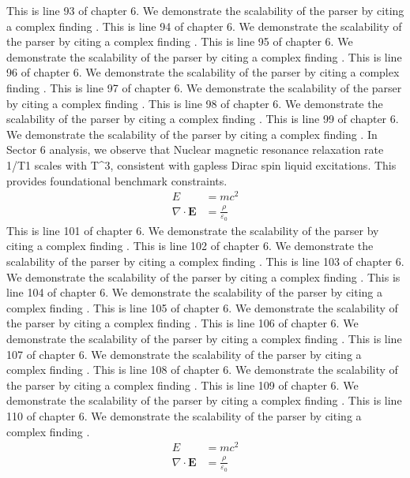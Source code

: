 This is line 93 of chapter 6. We demonstrate the scalability of the parser by citing a complex finding \cite{ref6_93}.
This is line 94 of chapter 6. We demonstrate the scalability of the parser by citing a complex finding \cite{ref6_94}.
This is line 95 of chapter 6. We demonstrate the scalability of the parser by citing a complex finding \cite{ref6_95}.
This is line 96 of chapter 6. We demonstrate the scalability of the parser by citing a complex finding \cite{ref6_96}.
This is line 97 of chapter 6. We demonstrate the scalability of the parser by citing a complex finding \cite{ref6_97}.
This is line 98 of chapter 6. We demonstrate the scalability of the parser by citing a complex finding \cite{ref6_98}.
This is line 99 of chapter 6. We demonstrate the scalability of the parser by citing a complex finding \cite{ref6_99}.
In Sector 6 analysis, we observe that Nuclear magnetic resonance relaxation rate 1/T1 scales with T^3, consistent with gapless Dirac spin liquid excitations. This provides foundational benchmark constraints.
\begin{align*}
  E &= mc^2 \\
  \nabla \cdot \mathbf{E} &= \frac{\rho}{\varepsilon_0}
\end{align*}
This is line 101 of chapter 6. We demonstrate the scalability of the parser by citing a complex finding \cite{ref6_101}.
This is line 102 of chapter 6. We demonstrate the scalability of the parser by citing a complex finding \cite{ref6_102}.
This is line 103 of chapter 6. We demonstrate the scalability of the parser by citing a complex finding \cite{ref6_103}.
This is line 104 of chapter 6. We demonstrate the scalability of the parser by citing a complex finding \cite{ref6_104}.
This is line 105 of chapter 6. We demonstrate the scalability of the parser by citing a complex finding \cite{ref6_105}.
This is line 106 of chapter 6. We demonstrate the scalability of the parser by citing a complex finding \cite{ref6_106}.
This is line 107 of chapter 6. We demonstrate the scalability of the parser by citing a complex finding \cite{ref6_107}.
This is line 108 of chapter 6. We demonstrate the scalability of the parser by citing a complex finding \cite{ref6_108}.
This is line 109 of chapter 6. We demonstrate the scalability of the parser by citing a complex finding \cite{ref6_109}.
This is line 110 of chapter 6. We demonstrate the scalability of the parser by citing a complex finding \cite{ref6_110}.
\begin{align*}
  E &= mc^2 \\
  \nabla \cdot \mathbf{E} &= \frac{\rho}{\varepsilon_0}
\end{align*}
